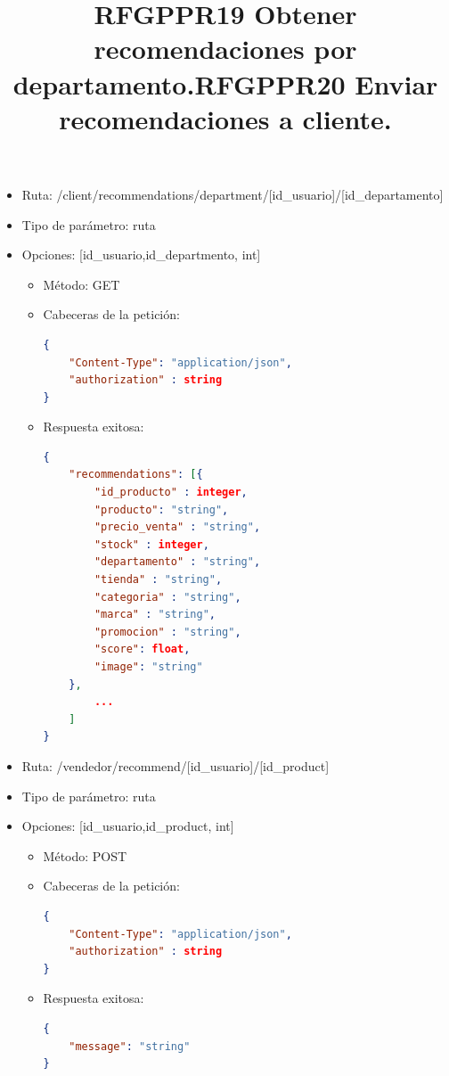 \title{\textbf{RFGPPR19 Obtener recomendaciones por departamento.}}
\begin{itemize}
\item Ruta: /client/recommendations/department/[id\_usuario]/[id\_departamento]
\item Tipo de parámetro: ruta
\item Opciones: [id\_usuario,id\_departmento, int]
\begin{itemize}
\item Método: GET
\item Cabeceras de la petición: 
\begin{lstlisting}[language=json,firstnumber=1]
{
	"Content-Type": "application/json",
	"authorization" : string
}
\end{lstlisting}
\item Respuesta exitosa: 
\begin{lstlisting}[language=json,firstnumber=1]
{
	"recommendations": [{
		"id_producto" : integer,
  		"producto": "string",
  		"precio_venta" : "string",
  		"stock" : integer,
  		"departamento" : "string",
  		"tienda" : "string",
  		"categoria" : "string",
  		"marca" : "string",
  		"promocion" : "string",
  		"score": float,
 	 	"image": "string"
	},
		...
	]
}
\end{lstlisting}
\end{itemize}
\end{itemize}

\title{\textbf{RFGPPR20 Enviar recomendaciones a cliente.}}
\begin{itemize}
\item Ruta: /vendedor/recommend/[id\_usuario]/[id\_product]
\item Tipo de parámetro: ruta
\item Opciones: [id\_usuario,id\_product, int]
\begin{itemize}
\item Método: POST
\item Cabeceras de la petición: 
\begin{lstlisting}[language=json,firstnumber=1]
{
	"Content-Type": "application/json",
	"authorization" : string
}
\end{lstlisting}
\item Respuesta exitosa: 
\begin{lstlisting}[language=json,firstnumber=1]
{
	"message": "string"
}
\end{lstlisting}
\end{itemize}
\end{itemize}

